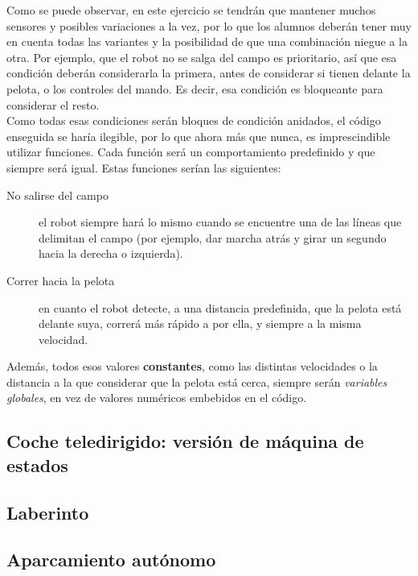Como se puede observar, en este ejercicio se tendrán que mantener muchos sensores y posibles variaciones a la vez, por lo que los alumnos deberán tener muy en cuenta todas las variantes y la posibilidad de que una combinación niegue a la otra. Por ejemplo, que el robot no se salga del campo es prioritario, así que esa condición deberán considerarla la primera, antes de considerar si tienen delante la pelota, o los controles del mando. Es decir, esa condición es bloqueante para considerar el resto.\\
Como todas esas condiciones serán bloques de condición anidados, el código enseguida se haría ilegible, por lo que ahora más que nunca, es imprescindible utilizar funciones. Cada función será un comportamiento predefinido y que siempre será igual. Estas funciones serían las siguientes: 
\begin{description}
	\item [No salirse del campo] el robot siempre hará lo mismo cuando se encuentre una de las líneas que delimitan el campo (por ejemplo, dar marcha atrás y girar un segundo hacia la derecha o izquierda).
	\item [Correr hacia la pelota] en cuanto el robot detecte, a una distancia predefinida, que la pelota está delante suya, correrá más rápido a por ella, y siempre a la misma velocidad. 
	
\end{description}
Además, todos esos valores \textbf{constantes}, como las distintas velocidades o la distancia a la que considerar que la pelota está cerca, siempre serán \textit{variables globales}, en vez de valores numéricos embebidos en el código.

\subsection{Coche teledirigido: versión de máquina de estados}
\subsection{Laberinto}
\subsection{Aparcamiento autónomo}